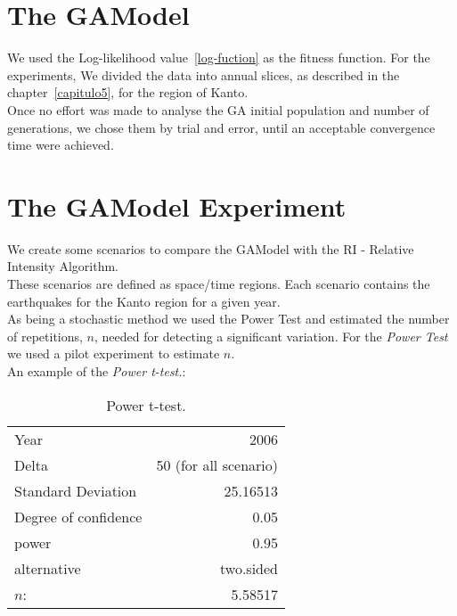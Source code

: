 \section{The GAModel}
We used the  Log-likelihood value~\ref{log-fuction} as the fitness function. For the experiments, We divided the data into annual slices, as described in the chapter~\ref{capitulo5}, for the region of Kanto.\\

Once no effort was made to analyse the GA initial population and number of generations, we chose them by trial and error, until an acceptable convergence time were achieved.\\

\section{The GAModel Experiment}
	We create some scenarios to compare the GAModel with the RI - Relative Intensity Algorithm.\\
	
	These scenarios are defined as space/time regions. Each scenario contains the earthquakes for the Kanto region for a given year.\\
	
	As being a stochastic method we used the Power Test and estimated the number of repetitions, $n$, needed for detecting a significant variation. For the  {\it Power Test} we used a pilot experiment to estimate $n$.\\
	
	An example of the  {\it Power t-test.}:\\

\begin{table}[!h]
  \begin{center}
  \begin{tabular}{|l|r|}
    \hline
    Year & 2006\\
    Delta & 50 (for all scenario)\\
    Standard Deviation &  25.16513\\
    Degree of confidence & 0.05\\
    power & 0.95\\
    alternative & two.sided\\
    \hline
    $n$: & 5.58517\\
    \hline    
  \end{tabular}
  \end{center}
  \caption{Power t-test.}
  \label{power}
\end{table}

